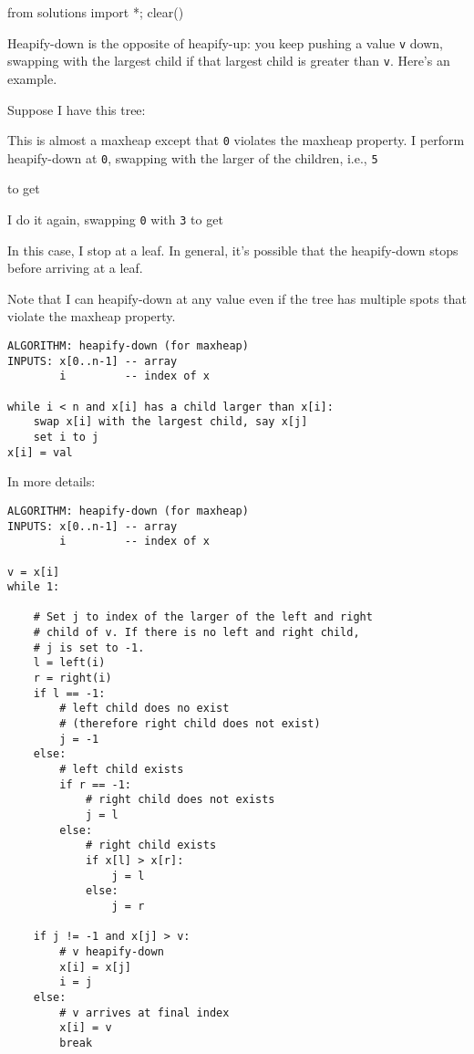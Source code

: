 \begin{python0}
from solutions import *; clear()
\end{python0}

Heapify-down is the opposite of heapify-up:
you keep pushing a value \verb!v! down, swapping with the largest child
if that largest child is greater than \verb!v!. 
Here's an example.

Suppose I have this tree:



This is almost a maxheap except that \verb!0!
violates the maxheap property.
I perform heapify-down at \verb!0!, swapping with
the larger of the children, i.e., \verb!5!




to get




I do it again, swapping \verb!0! with \verb!3! to get



In this case, I stop at a leaf.
In general, it's possible that the heapify-down stops before
arriving at a leaf.

Note that I can heapify-down at any value even if
the tree has multiple spots that violate the
maxheap property.

\begin{Verbatim}[frame=single]
ALGORITHM: heapify-down (for maxheap)
INPUTS: x[0..n-1] -- array
        i         -- index of x

while i < n and x[i] has a child larger than x[i]:
    swap x[i] with the largest child, say x[j]
    set i to j
x[i] = val
\end{Verbatim}

In more details:

\begin{Verbatim}[frame=single]
ALGORITHM: heapify-down (for maxheap)
INPUTS: x[0..n-1] -- array
        i         -- index of x

v = x[i]
while 1:

    # Set j to index of the larger of the left and right
    # child of v. If there is no left and right child,
    # j is set to -1.
    l = left(i)
    r = right(i)
    if l == -1:
        # left child does no exist
        # (therefore right child does not exist)
        j = -1
    else:
        # left child exists
        if r == -1:
            # right child does not exists
            j = l
        else:
            # right child exists
            if x[l] > x[r]:
                j = l
            else:
                j = r    

    if j != -1 and x[j] > v:
        # v heapify-down                
        x[i] = x[j]
        i = j
    else:
        # v arrives at final index
        x[i] = v
        break
\end{Verbatim}


